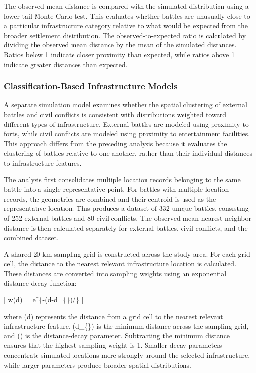 \documentclass[
  letterpaper,
  DIV=11,
  numbers=noendperiod]{scrartcl}
\begin{document}
The observed mean distance is compared with the simulated distribution
using a lower-tail Monte Carlo test. This evaluates whether battles are
unusually close to a particular infrastructure category relative to what
would be expected from the broader settlement distribution. The
observed-to-expected ratio is calculated by dividing the observed mean
distance by the mean of the simulated distances. Ratios below 1 indicate
closer proximity than expected, while ratios above 1 indicate greater
distances than expected.

\subsubsection{Classification-Based Infrastructure
Models}\label{classification-based-infrastructure-models}

A separate simulation model examines whether the spatial clustering of
external battles and civil conflicts is consistent with distributions
weighted toward different types of infrastructure. External battles are
modeled using proximity to forts, while civil conflicts are modeled
using proximity to entertainment facilities. This approach differs from
the preceding analysis because it evaluates the clustering of battles
relative to one another, rather than their individual distances to
infrastructure features.

The analysis first consolidates multiple location records belonging to
the same battle into a single representative point. For battles with
multiple location records, the geometries are combined and their
centroid is used as the representative location. This produces a dataset
of 332 unique battles, consisting of 252 external battles and 80 civil
conflicts. The observed mean nearest-neighbor distance is then
calculated separately for external battles, civil conflicts, and the
combined dataset.

A shared 20 km sampling grid is constructed across the study area. For
each grid cell, the distance to the nearest relevant infrastructure
location is calculated. These distances are converted into sampling
weights using an exponential distance-decay function:

{[} w(d) = e\^{}\{-(d-d\_\{\min\})/\lambda\} {]}

where (d) represents the distance from a grid cell to the nearest
relevant infrastructure feature, (d\_\{\min\}) is the minimum distance
across the sampling grid, and (\lambda) is the distance-decay parameter.
Subtracting the minimum distance ensures that the highest sampling
weight is 1. Smaller decay parameters concentrate simulated locations
more strongly around the selected infrastructure, while larger
parameters produce broader spatial distributions.
\end{document}
